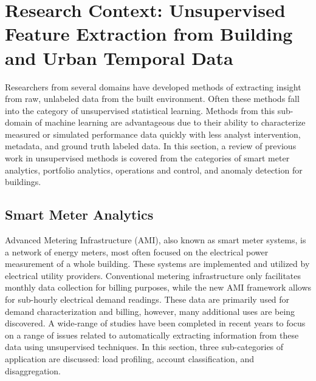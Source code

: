 \section{Research Context: Unsupervised Feature Extraction from Building and Urban Temporal Data}
\label{sec:litreview}

Researchers from several domains have developed methods of extracting insight from raw, unlabeled data from the built environment. Often these methods fall into the category of unsupervised statistical learning. Methods from this sub-domain of machine learning are advantageous due to their ability to characterize measured or simulated performance data quickly with less analyst intervention, metadata, and ground truth labeled data. In this section, a review of previous work in unsupervised methods is covered from the categories of smart meter analytics, portfolio analytics, operations and control, and anomaly detection for buildings. 

\subsection{Smart Meter Analytics}
\label{SmartMeter}
Advanced Metering Infrastructure (AMI), also known as smart meter systems, is a network of energy meters, most often focused on the electrical power measurement of a whole building. These systems are implemented and utilized by electrical utility providers. Conventional metering infrastructure only facilitates monthly data collection for billing purposes, while the new AMI framework allows for sub-hourly electrical demand readings. These data are primarily used for demand characterization and billing, however, many additional uses are being discovered. A wide-range of studies have been completed in recent years to focus on a range of issues related to automatically extracting information from these data using unsupervised techniques. In this section, three sub-categories of application are discussed: load profiling, account classification, and disaggregation.

